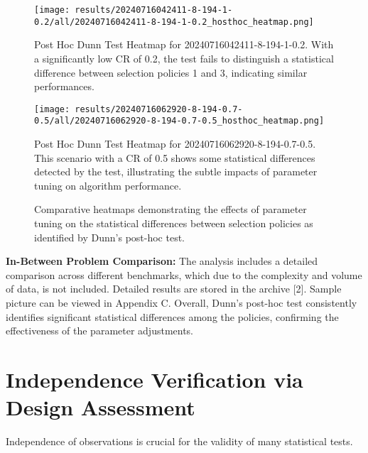 \documentclass[12pt,a4paper]{article}
\begin{document}
\begin{figure}[h]
    \centering
    \begin{minipage}{0.48\textwidth}
        \texttt{[image: results/20240716042411-8-194-1-0.2/all/20240716042411-8-194-1-0.2\_hosthoc\_heatmap.png]}
        \caption{Post Hoc Dunn Test Heatmap for 20240716042411-8-194-1-0.2. With a significantly low CR of 0.2, the test fails to distinguish a statistical difference between selection policies 1 and 3, indicating similar performances.}
        \label{fig:heatmap-low-cr}
    \end{minipage}\hfill
    \begin{minipage}{0.48\textwidth}
        \texttt{[image: results/20240716062920-8-194-0.7-0.5/all/20240716062920-8-194-0.7-0.5\_hosthoc\_heatmap.png]}
        \caption{Post Hoc Dunn Test Heatmap for 20240716062920-8-194-0.7-0.5. This scenario with a CR of 0.5 shows some statistical differences detected by the test, illustrating the subtle impacts of parameter tuning on algorithm performance.}
        \label{fig:heatmap-mid-cr}
    \end{minipage}
    \caption{Comparative heatmaps demonstrating the effects of parameter tuning on the statistical differences between selection policies as identified by Dunn's post-hoc test.}
    \label{fig:posthoc-heatmaps}
\end{figure}

\textbf{In-Between Problem Comparison:} The analysis includes a detailed comparison across different benchmarks, which due to the complexity and volume of data, is not included. Detailed results are stored in the archive [2]. Sample picture can be viewed in Appendix C. Overall, Dunn's post-hoc test consistently identifies significant statistical differences among the policies, confirming the effectiveness of the parameter adjustments.



\section{Independence Verification via Design Assessment}
Independence of observations is crucial for the validity of many statistical tests.
\end{document}
